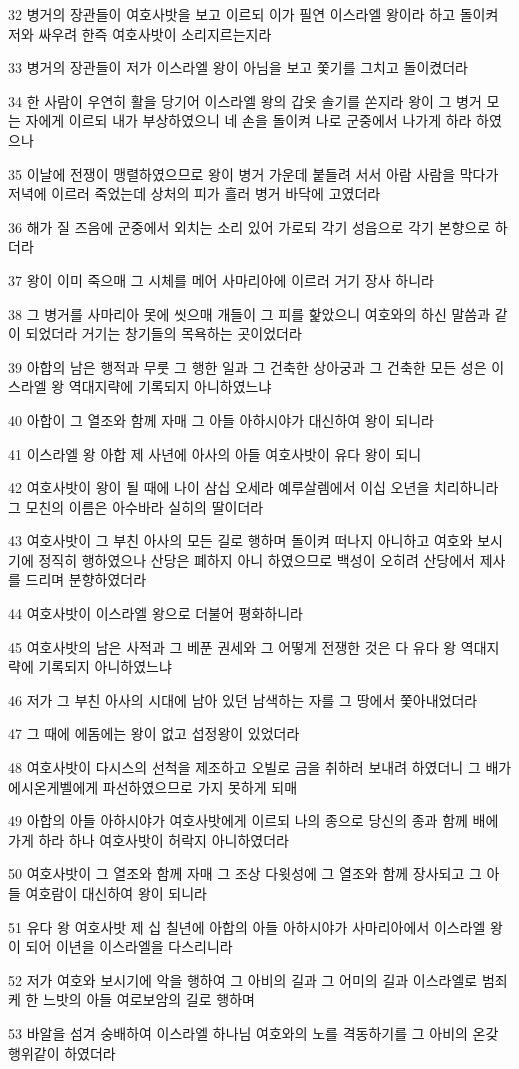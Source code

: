 \par 32 병거의 장관들이 여호사밧을 보고 이르되 이가 필연 이스라엘 왕이라 하고 돌이켜 저와 싸우려 한즉 여호사밧이 소리지르는지라
\par 33 병거의 장관들이 저가 이스라엘 왕이 아님을 보고 쫓기를 그치고 돌이켰더라
\par 34 한 사람이 우연히 활을 당기어 이스라엘 왕의 갑옷 솔기를 쏜지라 왕이 그 병거 모는 자에게 이르되 내가 부상하였으니 네 손을 돌이켜 나로 군중에서 나가게 하라 하였으나
\par 35 이날에 전쟁이 맹렬하였으므로 왕이 병거 가운데 붙들려 서서 아람 사람을 막다가 저녁에 이르러 죽었는데 상처의 피가 흘러 병거 바닥에 고였더라
\par 36 해가 질 즈음에 군중에서 외치는 소리 있어 가로되 각기 성읍으로 각기 본향으로 하더라
\par 37 왕이 이미 죽으매 그 시체를 메어 사마리아에 이르러 거기 장사 하니라
\par 38 그 병거를 사마리아 못에 씻으매 개들이 그 피를 핥았으니 여호와의 하신 말씀과 같이 되었더라 거기는 창기들의 목욕하는 곳이었더라
\par 39 아합의 남은 행적과 무룻 그 행한 일과 그 건축한 상아궁과 그 건축한 모든 성은 이스라엘 왕 역대지략에 기록되지 아니하였느냐
\par 40 아합이 그 열조와 함께 자매 그 아들 아하시야가 대신하여 왕이 되니라
\par 41 이스라엘 왕 아합 제 사년에 아사의 아들 여호사밧이 유다 왕이 되니
\par 42 여호사밧이 왕이 될 때에 나이 삼십 오세라 예루살렘에서 이십 오년을 치리하니라 그 모친의 이름은 아수바라 실히의 딸이더라
\par 43 여호사밧이 그 부친 아사의 모든 길로 행하며 돌이켜 떠나지 아니하고 여호와 보시기에 정직히 행하였으나 산당은 폐하지 아니 하였으므로 백성이 오히려 산당에서 제사를 드리며 분향하였더라
\par 44 여호사밧이 이스라엘 왕으로 더불어 평화하니라
\par 45 여호사밧의 남은 사적과 그 베푼 권세와 그 어떻게 전쟁한 것은 다 유다 왕 역대지략에 기록되지 아니하였느냐
\par 46 저가 그 부친 아사의 시대에 남아 있던 남색하는 자를 그 땅에서 쫓아내었더라
\par 47 그 때에 에돔에는 왕이 없고 섭정왕이 있었더라
\par 48 여호사밧이 다시스의 선척을 제조하고 오빌로 금을 취하러 보내려 하였더니 그 배가 에시온게벨에게 파선하였으므로 가지 못하게 되매
\par 49 아합의 아들 아하시야가 여호사밧에게 이르되 나의 종으로 당신의 종과 함께 배에 가게 하라 하나 여호사밧이 허락지 아니하였더라
\par 50 여호사밧이 그 열조와 함께 자매 그 조상 다윗성에 그 열조와 함께 장사되고 그 아들 여호람이 대신하여 왕이 되니라
\par 51 유다 왕 여호사밧 제 십 칠년에 아합의 아들 아하시야가 사마리아에서 이스라엘 왕이 되어 이년을 이스라엘을 다스리니라
\par 52 저가 여호와 보시기에 악을 행하여 그 아비의 길과 그 어미의 길과 이스라엘로 범죄케 한 느밧의 아들 여로보암의 길로 행하며
\par 53 바알을 섬겨 숭배하여 이스라엘 하나님 여호와의 노를 격동하기를 그 아비의 온갖 행위같이 하였더라


